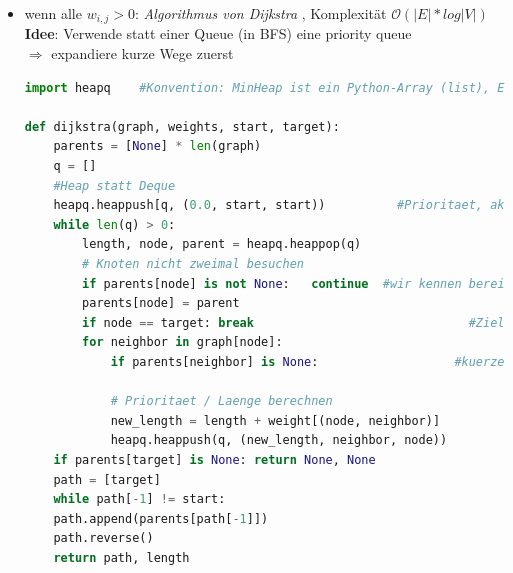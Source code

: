 \documentclass[11pt, fleqn]{scrreprt}
\begin{document}
		\begin{itemize}
		\item wenn alle $w_{i, j} > 0$: \emph{Algorithmus von Dijkstra} , Komplexität $\mathcal{O}(|E| * log|V|)$ \\
		\textbf{Idee}: Verwende statt einer Queue (in BFS) eine priority queue \\
		$\Rightarrow$ expandiere kurze Wege zuerst
		\begin{lstlisting}[language=Python]
import heapq    #Konvention: MinHeap ist ein Python-Array (list), Elemente sind Tupel(priority, data1, data2, ...) (Anwendungsdaten)

def dijkstra(graph, weights, start, target):
	parents = [None] * len(graph)
	q = []
	#Heap statt Deque
	heapq.heappush[q, (0.0, start, start)) 			#Prioritaet, aktueller Knoten, parent
	while len(q) > 0:
		length, node, parent = heapq.heappop(q)
		# Knoten nicht zweimal besuchen
		if parents[node] is not None:   continue  #wir kennen bereits kuerzeren Weg
		parents[node] = parent
		if node == target: break   							  #Ziel gefunden
		for neighbor in graph[node]:
			if parents[neighbor] is None:   				#kuerzester Weg zu neighbor noch 
																							#nicht bekannt
			# Prioritaet / Laenge berechnen
			new_length = length + weight[(node, neighbor)]
			heapq.heappush(q, (new_length, neighbor, node))
	if parents[target] is None: return None, None
	path = [target]
	while path[-1] != start:
	path.append(parents[path[-1]])
	path.reverse()
	return path, length
		\end{lstlisting}
		\end{itemize}
		
\end{document}
